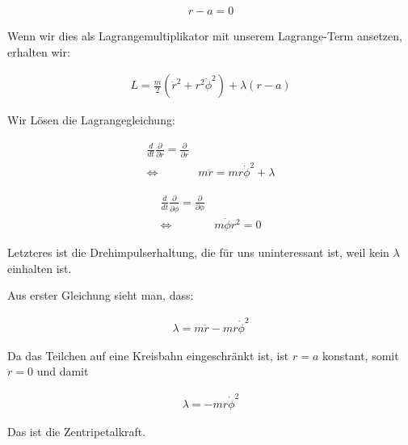 \documentclass[a4paper,german,12pt,smallheadings]{scrartcl}
\begin{document}
\begin{align*}
  r - a = 0
\end{align*}

Wenn wir dies als Lagrangemultiplikator mit unserem Lagrange-Term ansetzen, erhalten wir:

\begin{align*}
  L = \frac{m}{2} (\dot{r}^2 + r^2\dot{\phi}^2)  + \lambda(r-a)
\end{align*}

Wir Lösen die Lagrangegleichung:

\begin{align*}
  \frac{d}{dt} \frac{\partial}{\partial \dot{r}} = \frac{\partial}{\partial r} \\
  \Leftrightarrow\quad& m\ddot{r} = mr\dot{\phi}^2 + \lambda
\end{align*}

\begin{align*}
  \frac{d}{dt} \frac{\partial}{\partial \dot{\phi}} = \frac{\partial}{\partial \phi} \\
  \Leftrightarrow\quad& m\ddot{\phi}r^2 = 0
\end{align*}

Letzteres ist die Drehimpulserhaltung, die für uns uninteressant ist, weil kein
$\lambda$ einhalten ist.

Aus erster Gleichung sieht man, dass:

\begin{align*}
  \lambda = m\ddot{r} - mr\dot{\phi}^2
\end{align*}

Da das Teilchen auf eine Kreisbahn eingeschränkt ist, ist $r=a$ konstant, somit $\ddot{r} = 0$ und damit

\begin{align*}
  \lambda = -mr\dot{\phi}^2
\end{align*}

Das ist die Zentripetalkraft.
\end{document}
